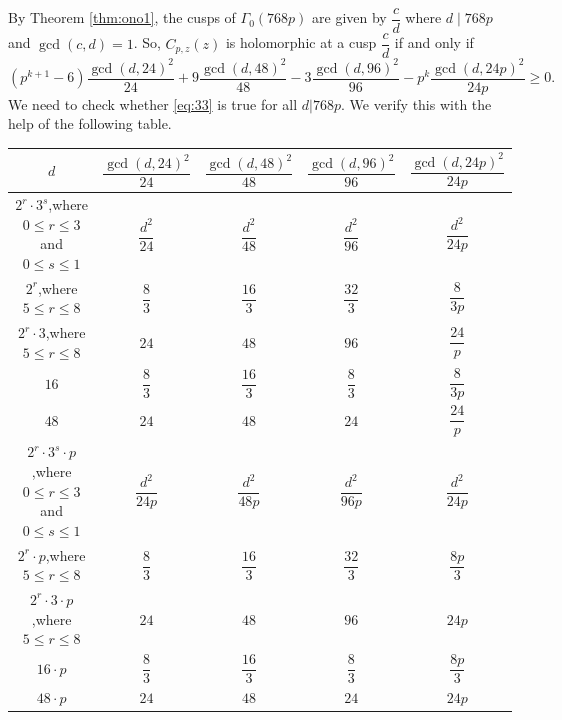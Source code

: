 \documentclass[12pt,reqno]{amsart}
\numberwithin{equation}{section}
\begin{document}
    By Theorem \ref{thm:ono1}, the cusps of $\Gamma_0(768p)$ are given by $\dfrac{c}{d}$ where $d\mid768p$ and $\gcd(c,d)=1$. So, $C_{p,z}(z)$ is holomorphic at a cusp $\dfrac{c}{d}$ if and only if
    \begin{equation}\label{eq:33}
        (p^{k+1}-6)\frac{\gcd(d,24)^2}{24}+9\frac{\gcd(d,48)^2}{48}-3\frac{\gcd(d,96)^2}{96}-p^k\frac{\gcd(d,24p)^2}{24p}\geq 0.
    \end{equation}
    We need to check whether \eqref{eq:33} is true for all $d|768p$. We verify this with the help of the following table.
    \begin{center}
	{\setlength{\extrarowheight}{18pt}\begin{tabular}{|c|c|c|c|c|}
	\hline 
        $d$ & $\dfrac{\gcd(d,24)^2}{24}$ &$\dfrac{\gcd(d,48)^2}{48}$&$\dfrac{\gcd(d,96)^2}{96}$&$\dfrac{\gcd(d,24p)^2}{24p}$\\
        \hline
        $2^r\cdot 3^s$,where $0\leq r
        \leq 3$ and $0\leq s
        \leq 1$ & $\dfrac{d^2}{24}$ & $\dfrac{d^2}{48}$ & $\dfrac{d^2}{96}$ & $\dfrac{d^2}{24p}$\\
         \hline
         $2^r$,where $5\leq r
        \leq 8$ & $\dfrac{8}{3}$ & $\dfrac{16}{3}$ & $\dfrac{32}{3}$ & $\dfrac{8}{3p}$\\
       \hline
        $2^r\cdot3$,where $5\leq r
        \leq 8$ & $24$ & $48$ & $96$ & $\dfrac{24}{p}$\\
         \hline
          $16$ & $\dfrac{8}{3}$ & $\dfrac{16}{3}$ & $\dfrac{8}{3}$ & $\dfrac{8}{3p}$\\
         \hline
         $48$ & $24$ & $48$ & $24$ & $\dfrac{24}{p}$\\
         \hline
        $2^r\cdot3^s\cdot p$,where $0\leq r
        \leq 3$ and $0\leq s
        \leq 1$ & $\dfrac{d^2}{24p}$ & $\dfrac{d^2}{48p}$ & $\dfrac{d^2}{96p}$ & $\dfrac{d^2}{24p}$\\
         \hline
         $2^r\cdot p$,where $5\leq r
        \leq 8$ & $\dfrac{8}{3}$ & $\dfrac{16}{3}$ & $\dfrac{32}{3}$ & $\dfrac{8p}{3}$\\
         \hline
        $2^r\cdot 3 \cdot p$,where $5\leq r
        \leq 8$ & $24$ & $48$ & $96$ & $24p$\\
         \hline
          $16\cdot p$ & $\dfrac{8}{3}$ & $\dfrac{16}{3}$ & $\dfrac{8}{3}$ & $\dfrac{8p}{3}$\\
         \hline
         $48\cdot p$ & $24$ & $48$ & $24$ & $24p$\\
         \hline
	\end{tabular}}
\end{center}
\end{document}
